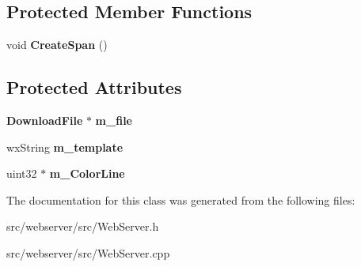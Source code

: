 \subsection*{Protected Member Functions}
\begin{DoxyCompactItemize}
\item 
void {\bfseries CreateSpan} ()\label{classCProgressImage_a68293e840047eddbd7f5a32541426d28}

\end{DoxyCompactItemize}
\subsection*{Protected Attributes}
\begin{DoxyCompactItemize}
\item 
{\bf DownloadFile} $\ast$ {\bfseries m\_\-file}\label{classCProgressImage_aa773a644fc87dea59830d8ea7c6d47ac}

\item 
wxString {\bfseries m\_\-template}\label{classCProgressImage_a6579b4188417635b6b198b12d591495a}

\item 
uint32 $\ast$ {\bfseries m\_\-ColorLine}\label{classCProgressImage_a51d4f5645ce5a8b8e4557ac32356888f}

\end{DoxyCompactItemize}


The documentation for this class was generated from the following files:\begin{DoxyCompactItemize}
\item 
src/webserver/src/WebServer.h\item 
src/webserver/src/WebServer.cpp\end{DoxyCompactItemize}
